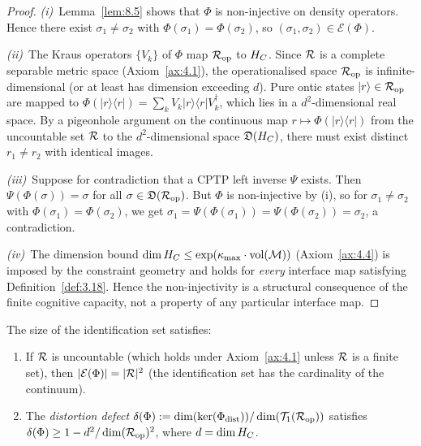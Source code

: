 \begin{proof}
\textit{(i)}~Lemma~\ref{lem:8.5} shows that $\Phi$ is non-injective
on density operators.  Hence there exist $\sigma_1 \neq \sigma_2$ with
$\Phi(\sigma_1) = \Phi(\sigma_2)$, so
$(\sigma_1, \sigma_2) \in \mathcal{E}(\Phi)$.

\textit{(ii)}~The Kraus operators $\{V_k\}$ of $\Phi$ map
$\mathcal{R}_{\mathrm{op}}$ to $H_C$.  Since $\mathcal{R}$ is a complete separable
metric space (Axiom~\ref{ax:4.1}), the operationalised space
$\mathcal{R}_{\mathrm{op}}$ is infinite-dimensional (or at least has
dimension exceeding $d$).  Pure ontic states
$|r\rangle \in \mathcal{R}_{\mathrm{op}}$ are mapped to
$\Phi(|r\rangle\langle r|) = \sum_k V_k|r\rangle\langle r|V_k^\dagger$,
which lies in a $d^2$-dimensional real space.  By a pigeonhole argument
on the continuous map $r \mapsto \Phi(|r\rangle\langle r|)$ from the
uncountable set $\mathcal{R}$ to the $d^2$-dimensional space
$\mathfrak{D}(H_C)$, there must exist distinct $r_1 \neq r_2$ with
identical images.

\textit{(iii)}~Suppose for contradiction that a CPTP left inverse
$\Psi$ exists.  Then $\Psi(\Phi(\sigma)) = \sigma$ for all
$\sigma \in \mathfrak{D}(\mathcal{R}_{\mathrm{op}})$.  But $\Phi$ is
non-injective by (i), so for $\sigma_1 \neq \sigma_2$ with
$\Phi(\sigma_1) = \Phi(\sigma_2)$, we get
$\sigma_1 = \Psi(\Phi(\sigma_1)) = \Psi(\Phi(\sigma_2)) = \sigma_2$,
a contradiction.

\textit{(iv)}~The dimension bound $\dim H_C \leq
\exp(\kappa_{\max} \cdot \mathrm{vol}(\mathcal{M}))$ (Axiom~\ref{ax:4.4})
is imposed by the constraint geometry and holds for \emph{every}
interface map satisfying Definition~\ref{def:3.18}.  Hence the
non-injectivity is a structural consequence of the finite cognitive
capacity, not a property of any particular interface map.
\end{proof}

\begin{proposition}
\label{prop:8.1}
The size of the identification set satisfies:
\begin{enumerate}
  \item[\textup{(i)}] If $\mathcal{R}$ is uncountable
    \textup{(}which holds under Axiom~\textup{\ref{ax:4.1}}
    unless $\mathcal{R}$ is a finite set\textup{)}, then
    $|\mathcal{E}(\Phi)| = |\mathcal{R}|^2$ \textup{(}the identification set
    has the cardinality of the continuum\textup{)}.
  \item[\textup{(ii)}] The \emph{distortion defect}
    $\delta(\Phi) := \dim(\mathrm{ker}(\Phi_{\mathrm{dist}}))
    / \dim(\mathcal{T}_1(\mathcal{R}_{\mathrm{op}}))$ satisfies
    $\delta(\Phi) \geq 1 - d^2 / \dim(\mathcal{R}_{\mathrm{op}})^2$, where
    $d = \dim H_C$.
\end{enumerate}
\end{proposition}

